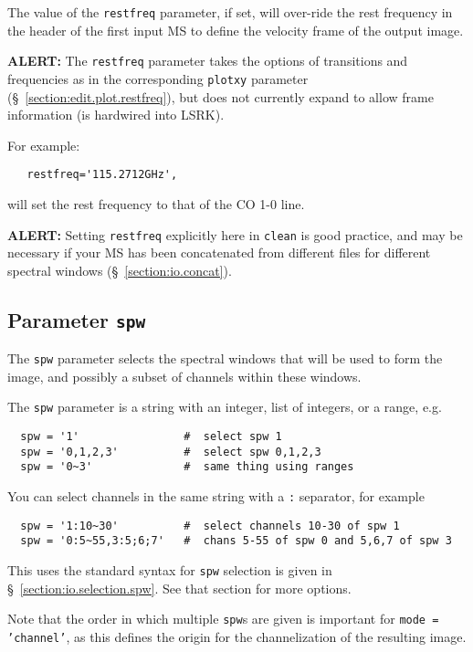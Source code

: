 The value of the {\tt restfreq} parameter, if set, will over-ride
the rest frequency in the header of the first input MS to define
the velocity frame of the output image.

{\bf ALERT:} The {\tt restfreq} parameter takes the options
of transitions and frequencies as in the corresponding {\tt plotxy}
parameter (\S~\ref{section:edit.plot.restfreq}), but does not
currently expand to allow frame information (is hardwired into LSRK).

For example:
\small
\begin{verbatim}
   restfreq='115.2712GHz',
\end{verbatim}
\normalsize
will set the rest frequency to that of the CO 1-0 line.

{\bf ALERT:} Setting {\tt restfreq} explicitly here in
{\tt clean} is good practice, and may be necessary if your MS has
been concatenated from different files for different spectral
windows (\S~\ref{section:io.concat}).

\subsection{Parameter {\tt spw} }
\label{section:im.pars.spw}

The {\tt spw} parameter selects the spectral windows that will
be used to form the image, and possibly a subset of channels
within these windows.

The {\tt spw} parameter is a string with an integer, list
of integers, or a range, e.g.  
\small
\begin{verbatim}
  spw = '1'                #  select spw 1
  spw = '0,1,2,3'          #  select spw 0,1,2,3
  spw = '0~3'              #  same thing using ranges
\end{verbatim}
\normalsize
You can select channels in the same string with a {\tt :} separator,
for example
\small
\begin{verbatim}
  spw = '1:10~30'          #  select channels 10-30 of spw 1
  spw = '0:5~55,3:5;6;7'   #  chans 5-55 of spw 0 and 5,6,7 of spw 3
\end{verbatim}
\normalsize
This uses the standard syntax for {\tt spw} selection is given in 
\S~\ref{section:io.selection.spw}.  See that section for more
options.

Note that the order in which multiple {\tt spw}s are given is
important for {\tt mode = 'channel'}, as
this defines the origin for the channelization of the resulting
image.

